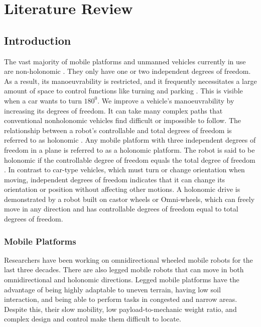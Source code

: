 \chapter{Literature Review}
\label{sec:review}
\section{Introduction}
The vast majority of mobile platforms and unmanned vehicles currently in use are non-holonomic \cite{sanchez-orta_aerial_2020}. They only have one or two independent degrees of freedom. As a result, its manoeuvrability is restricted, and it frequently necessitates a large amount of space to control functions like turning and parking \cite{bremer_problems_2010}. This is visible when a car wants to turn $180^0$. We improve a vehicle's manoeuvrability by increasing its degrees of freedom. It can take many complex paths that conventional nonholonomic vehicles find difficult or impossible to follow. The relationship between a robot's controllable and total degrees of freedom is referred to as holonomic \cite{yun_unified_1998}. Any mobile platform with three independent degrees of freedom in a plane is referred to as a holonomic platform. The robot is said to be holonomic if the controllable degree of freedom equals the total degree of freedom \cite{thompson_chapter_2017}. In contrast to car-type vehicles, which must turn or change orientation when moving, independent degrees of freedom indicates that it can change its orientation or position without affecting other motions. A holonomic drive is demonstrated by a robot built on castor wheels or Omni-wheels, which can freely move in any direction and has controllable degrees of freedom equal to total degrees of freedom.

\subsection{Mobile Platforms}
Researchers have been working on omnidirectional wheeled mobile robots for the last three decades. There are also legged mobile robots that can move in both omnidirectional and holonomic directions. Legged mobile platforms have the advantage of being highly adaptable to uneven terrain, having low soil interaction, and being able to perform tasks in congested and narrow areas. Despite this, their slow mobility, low payload-to-mechanic weight ratio, and complex design and control make them difficult to locate.


